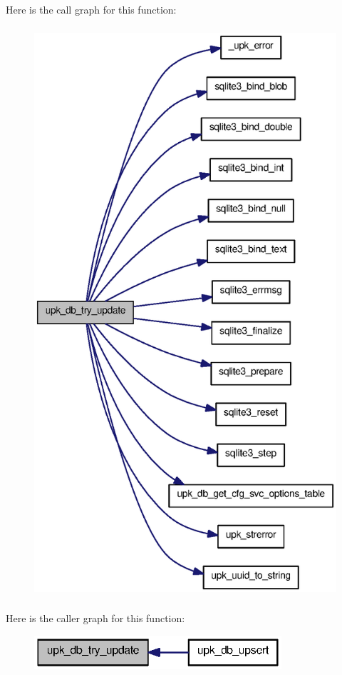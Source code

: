 Here is the call graph for this function:
\nopagebreak
\begin{figure}[H]
\begin{center}
\leavevmode
\includegraphics[height=600pt]{tp_8c_a3663936bb5323fc1e444203b2893273f_cgraph}
\end{center}
\end{figure}




Here is the caller graph for this function:
\nopagebreak
\begin{figure}[H]
\begin{center}
\leavevmode
\includegraphics[width=260pt]{tp_8c_a3663936bb5323fc1e444203b2893273f_icgraph}
\end{center}
\end{figure}


